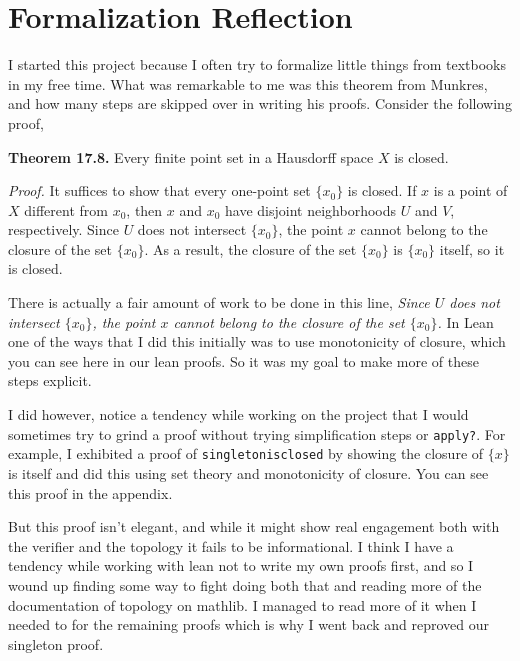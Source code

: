 \documentclass[11pt]{article}
\begin{document}

\section{Formalization Reflection}

I started this project because I often try to formalize little things from textbooks in my free time. What was remarkable to me was this theorem from Munkres, and how many steps are skipped over in writing his proofs. Consider the following proof, 

\textbf{Theorem 17.8.} Every finite point set in a Hausdorff space $X$ is closed.

\textit{Proof.} It suffices to show that every one-point set $\{x_0\}$ is closed. 
If $x$ is a point of $X$ different from $x_0$, then $x$ and $x_0$ have disjoint neighborhoods $U$ and $V$, respectively. 
Since $U$ does not intersect $\{x_0\}$, the point $x$ cannot belong to the closure of the set $\{x_0\}$. 
As a result, the closure of the set $\{x_0\}$ is $\{x_0\}$ itself, so it is closed.

There is actually a fair amount of work to be done in this line, \emph{Since $U$ does not intersect $\{x_0\}$, the point $x$ cannot belong to the closure of the set $\{x_0\}$.} In Lean one of the ways that I did this initially was to use monotonicity of closure, which you can see here in our lean proofs. So it was my goal to make more of these steps explicit.

I did however, notice a tendency while working on the project that I would sometimes try to grind a proof without trying simplification steps or \verb|apply?|. For example, I exhibited a proof of \verb|singletonisclosed| by showing the closure of $\{x\}$ is itself and did this using set theory and monotonicity of closure. You can see this proof in the appendix.  

But this proof isn't elegant, and while it might show real engagement both with the verifier and the topology it fails to be informational. I think I have a tendency while working with lean not to write my own proofs first, and so I wound up finding some way to fight doing both that and reading more of the documentation of topology on mathlib. I managed to read more of it when I needed to for the remaining proofs which is why I went back and reproved our singleton proof.
\end{document}
